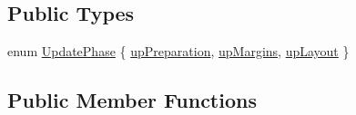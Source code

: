 \subsection*{Public Types}
\begin{DoxyCompactItemize}
\item 
enum \hyperlink{classQCPLayoutElement_a0d83360e05735735aaf6d7983c56374d}{Update\+Phase} \{ \hyperlink{classQCPLayoutElement_a0d83360e05735735aaf6d7983c56374dad6119882eba136357c2f627992e527d3}{up\+Preparation}, 
\hyperlink{classQCPLayoutElement_a0d83360e05735735aaf6d7983c56374da288cb59a92280e47261a341f2813e676}{up\+Margins}, 
\hyperlink{classQCPLayoutElement_a0d83360e05735735aaf6d7983c56374da5d1ccf5d79967c232c3c511796860045}{up\+Layout}
 \}
\end{DoxyCompactItemize}
\subsection*{Public Member Functions}
